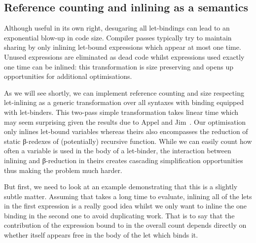 \subsection{Reference counting and inlining as a semantics}\label{section:inlining}

Although useful in its own right, desugaring all let-bindings can lead
to an exponential blow-up in code size. Compiler passes typically try
to maintain sharing by only inlining let-bound expressions which appear
at most one time. Unused expressions are eliminated as dead code whilst
expressions used exactly one time can be inlined: this transformation is
size preserving and opens up opportunities for additional optimisations.

As we will see shortly, we can implement reference counting and size
respecting let-inlining as a generic transformation over all syntaxes
with binding equipped with let-binders. This two-pass simple transformation
takes linear time which may seem surprising given the results due to Appel and
Jim~\citeyear{DBLP:journals/jfp/AppelJ97}. Our optimisation only inlines
let-bound variables whereas theirs also encompasses the reduction of static
β-redexes of (potentially) recursive function. While we can easily count how
often a variable is used in the body of a let-binder, the interaction between
inlining and β-reduction in theirs creates cascading simplification opportunities
thus making the problem much harder.

But first, we need to look at an example demonstrating that this is a
slightly subtle matter. Assuming that  takes a long time
to evaluate, inlining all of the lets in the first expression is a really
good idea whilst we only want to inline the one binding  in the
second one to avoid duplicating work. That is to say that the contribution
of the expression bound to  in the overall count depends directly
on whether  itself appears free in the body of the let which binds it.

\noindent
\begin{minipage}{\textwidth}
  \begin{minipage}{0.45\textwidth}
    \centering
  \end{minipage}
  \begin{minipage}{0.45\textwidth}
    \centering
  \end{minipage}
\end{minipage}

